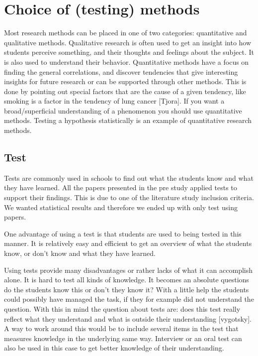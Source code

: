 \chapter{Choice of (testing) methods}
Most research methods can be placed in one of two categories: quantitative and qualitative methods. Qualitative research is often used to get an insight into how students perceive something, and their thoughts and feelings about the subject. It is also used to understand their behavior. Quantitative methods have a focus on finding the general correlations, and discover tendencies that give interesting insights for future research or can be supported through other methods. This is done by pointing out special factors that are the cause of a given tendency, like smoking is a factor in the tendency of lung cancer [Tjora]. If you want a broad/superficial understanding of a phenomenon you should use quantitative methods. Testing a hypothesis statistically is an example of quantitative research methods. 

\section{Test}
Tests are commonly used  in schools to find out what the students know and what they have learned. All the papers presented in the pre study applied tests to support their findings. This is due to one of the literature study inclusion criteria. We wanted statistical results and therefore we ended up with only test using papers. 

\bigskip\noindent
One advantage of using a test is that students are used to being tested in this manner. It is relatively easy and efficient to get an overview of what the students know, or don’t know and what they have learned.

\bigskip\noindent
Using tests provide many disadvantages or rather lacks of what it can accomplish alone. It is hard to test all kinds of knowledge. It becomes an absolute questions do the students know this or don’t they know it? With a little help the students could possibly have managed the task, if they for example did not understand the question. With this in mind the question about tests are: does this test really reflect what they understand and what is outside their understanding [vygotsky]. A way to work around this would be to include several items in the test that measures knowledge in the underlying same way. Interview or an oral test can also be used in this case to get better knowledge of their understanding.

